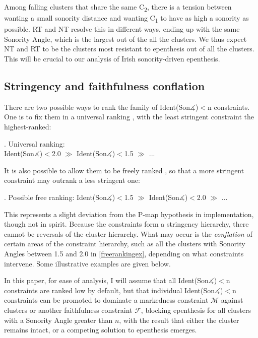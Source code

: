 \documentclass[12pt]{article}
\begin{document}
Among falling clusters that share the same C\textsubscript{2}, there is a tension between wanting a small sonority distance and wanting C\textsubscript{1} to have as high a sonority as possible. RT and NT resolve this in different ways, ending up with the same {\sc Sonority Angle}, which is the largest out of the all the clusters. We thus expect NT and RT to be the clusters most resistant to epenthesis out of all the clusters. This will be crucial to our analysis of Irish sonority-driven epenthesis.

\subsection{Stringency and faithfulness conflation}

There are two possible ways to rank the family of {\sc Ident(Son$\measuredangle$)}$<$n constraints.
One is to fix them in a universal ranking \citep{prince.smolensky.1993}, with the least stringent constraint the highest-ranked:

\ex. Universal ranking: \\
     {\sc Ident(Son$\measuredangle$)}$<$2.0 $\gg$ {\sc Ident(Son$\measuredangle$)}$<$1.5 $\gg$ ...

It is also possible to allow them to be freely ranked \citep[and others]{de.lacy.2004}, so that a more stringent constraint may outrank a less stringent one:

\ex. Possible free ranking: \label{freerankingex}
     {\sc Ident(Son$\measuredangle$)}$<$1.5 $\gg$ {\sc Ident(Son$\measuredangle$)}$<$2.0 $\gg$ ...

This represents a slight deviation from the P-map hypothesis \citep{steriade.2001} in implementation, though not in spirit. Because the constraints form a stringency hierarchy, there cannot be reversals of the cluster hierarchy. What may occur is the {\it conflation} of certain areas of the constraint hierarchy, such as all the clusters with {\sc Sonority Angles} between 1.5 and 2.0 in \ref{freerankingex}, depending on what constraints intervene. Some illustrative examples are given below.

\bigskip

In this paper, for ease of analysis, I will assume that all {\sc Ident(Son$\measuredangle$)}$<$n constraints are ranked low by default, but that individual {\sc Ident(Son$\measuredangle$)}$<$n constraints can be promoted to dominate a markedness constraint $\mathcal{M}$ against clusters or another faithfulness constraint $\mathcal{F}$, blocking epenthesis for all clusters with a {\sc Sonority Angle} greater than $n$, with the result that either the cluster remains intact, or a competing solution to epenthesis emerges.
\end{document}
